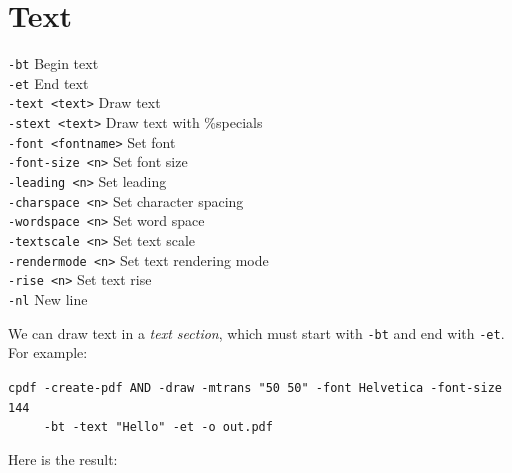 \documentclass{book}
\begin{document}
\section{Text}

  {\small\begin{framed}
   \noindent\verb!-bt! Begin text\\
   \noindent\verb!-et! End text\\
   \noindent\verb!-text <text>! Draw text\\
   \noindent\verb!-stext <text>! Draw text with \%specials\\
   \noindent\verb!-font <fontname>! Set font\\
   \noindent\verb!-font-size <n>! Set font size\\
   \noindent\verb!-leading <n>! Set leading\\
   \noindent\verb!-charspace <n>! Set character spacing\\
   \noindent\verb!-wordspace <n>! Set word space\\
   \noindent\verb!-textscale <n>! Set text scale\\
   \noindent\verb!-rendermode <n>! Set text rendering mode\\
   \noindent\verb!-rise <n>! Set text rise\\
   \noindent\verb!-nl! New line\end{framed}}

We can draw text in a \textit{text section}, which must start with \texttt{-bt} and end with \texttt{-et}. For example:

\begin{framed}
 \noindent\small\verb?cpdf -create-pdf AND -draw -mtrans "50 50" -font Helvetica -font-size 144?\\
 \noindent\small\verb?     -bt -text "Hello" -et -o out.pdf?
\end{framed}

\noindent Here is the result:
\end{document}
